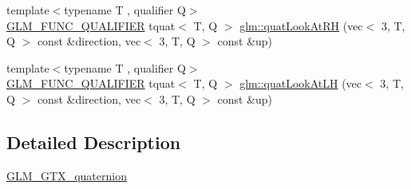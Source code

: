 \begin{DoxyCompactItemize}
{\footnotesize template$<$typename T , qualifier Q$>$ }\\\hyperlink{setup_8hpp_a33fdea6f91c5f834105f7415e2a64407}{G\+L\+M\+\_\+\+F\+U\+N\+C\+\_\+\+Q\+U\+A\+L\+I\+F\+I\+ER} tquat$<$ T, Q $>$ \hyperlink{group__gtx__quaternion_gad30cbeb78315773b6d18d9d1c1c75b77}{glm\+::quat\+Look\+At\+RH} (vec$<$ 3, T, Q $>$ const \&direction, vec$<$ 3, T, Q $>$ const \&up)
\item 
{\footnotesize template$<$typename T , qualifier Q$>$ }\\\hyperlink{setup_8hpp_a33fdea6f91c5f834105f7415e2a64407}{G\+L\+M\+\_\+\+F\+U\+N\+C\+\_\+\+Q\+U\+A\+L\+I\+F\+I\+ER} tquat$<$ T, Q $>$ \hyperlink{group__gtx__quaternion_ga6f1b3fba52fcab952d0ab523177ff443}{glm\+::quat\+Look\+At\+LH} (vec$<$ 3, T, Q $>$ const \&direction, vec$<$ 3, T, Q $>$ const \&up)
\end{DoxyCompactItemize}


\subsection{Detailed Description}
\hyperlink{group__gtx__quaternion}{G\+L\+M\+\_\+\+G\+T\+X\+\_\+quaternion} 
